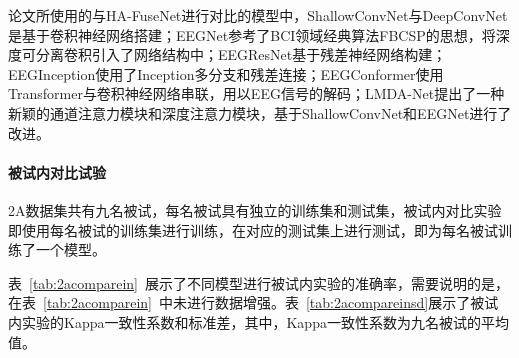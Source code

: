论文所使用的与HA-FuseNet进行对比的模型中，ShallowConvNet\cite{schirrmeister2017deep}与DeepConvNet\cite{schirrmeister2017deep}是基于卷积神经网络搭建；EEGNet\cite{lawhern2018eegnet}参考了BCI领域经典算法FBCSP的思想，将深度可分离卷积引入了网络结构中；EEGResNet\cite{HBM:HBM23730}基于残差神经网络\cite{he2016deep}构建；EEGInception\cite{zhang2021eeg}使用了Inception多分支和残差连接；EEGConformer\cite{song2022eeg}使用Transformer\cite{vaswani2017attention}与卷积神经网络串联，用以EEG信号的解码；LMDA-Net\cite{miao2023lmda}提出了一种新颖的通道注意力模块和深度注意力模块，基于ShallowConvNet和EEGNet进行了改进。

\paragraph{被试内对比试验}

2A数据集共有九名被试，每名被试具有独立的训练集和测试集，被试内对比实验即使用每名被试的训练集进行训练，在对应的测试集上进行测试，即为每名被试训练了一个模型。

表~\ref{tab:2acomparein}~展示了不同模型进行被试内实验的准确率，需要说明的是，在表~\ref{tab:2acomparein}~中未进行数据增强。表~\ref{tab:2acompareinsd}展示了被试内实验的Kappa一致性系数和标准差，其中，Kappa一致性系数为九名被试的平均值。

